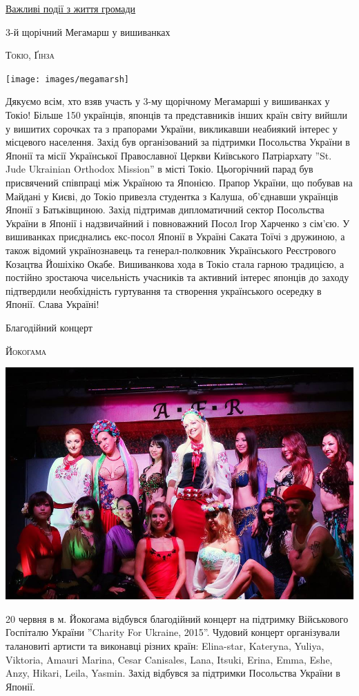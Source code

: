 \documentclass[10pt,a4paper]{article}
\newcommand{\Category}[1]{%
		\begin{center}	
			\Large \usefont{T2A}{kurier}{m}{n}
			\underline{#1}%
		\end{center}	
		\par \normalsize \normalfont}
\newcommand{\NewsItem}[1]{%
		\usefont{T2A}{iwona}{m}{n} 
		\large #1 \vspace{4pt}
		\par \normalsize \normalfont}
\newcommand{\NewsAuthor}[1]{%
			\hfill \textsc{#1} \vspace{4pt}
			\par \normalfont}
\begin{document}
\newpage

\Category{Важливі події з життя громади}
\begin{multicols}{3}

	\NewsItem{3-й щорічний Мегамарш у вишиванках}
	\NewsAuthor{Токіо, Ґінза}
		\begin{center}
			\texttt{[image: images/megamarsh]}
		\end{center}
Дякуємо всім, хто взяв участь у 3-му щорічному Мегамарші у вишиванках у Токіо! Більше 150 українців, японців та представників інших країн світу вийшли у вишитих сорочках та з прапорами України, викликавши неабиякий інтерес у місцевого населення. Захід був організований за підтримки Посольства України в Японії та місії Української Православної Церкви Київського Патріархату ''St. Jude Ukrainian Orthodox Mission'' в місті Токіо. Цьогорічний парад був присвячений співпраці між Україною та Японією. Прапор України, що побував на Майдані у Києві, до Токіо привезла студентка з Калуша, об'єднавши українців Японії з Батьківщиною. Захід підтримав дипломатичний сектор Посольства України в Японії і надзвичайний і повноважний Посол Ігор Харченко з сім'єю. У вишиванках приєднались екс-посол Японії в Україні Саката Тоїчі з дружиною, а також відомий українознавець та генерал-полковник Українського Реєстрового Козацтва Йошіхіко Окабе. Вишиванкова хода в Токіо стала гарною традицією, а постійно зростаюча чисельність учасників та активний інтерес японців до заходу підтвердили необхідність гуртування та створення українського осередку в Японії. Слава Україні!

\vspace{1cm}
	\NewsItem{Благодійний концерт}
	\NewsAuthor{Йокогама}
		\begin{center}
			\includegraphics[width=0.8\linewidth]{images/concert}
		\end{center}
20 червня в м. Йокогама відбувся благодійний концерт на підтримку Військового Госпіталю України ''Charity For Ukraine, 2015''.
Чудовий концерт організували талановиті артисти та виконавці різних країн: Elina-star, Kateryna, Yuliya, Viktoria, Amauri Marina, Cesar Canisales, Lana, Itsuki, Erina, Emma, Eshe, Anzy, Hikari, Leila, Yasmin. Захід відбувся за підтримки Посольства України в Японії. 


\end{multicols}
\end{document}
